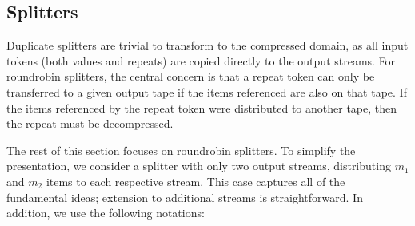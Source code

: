 
\subsection*{Splitters}

Duplicate splitters are trivial to transform to the compressed domain,
as all input tokens (both values and repeats) are copied directly to
the output streams.  For roundrobin splitters, the central concern is
that a repeat token can only be transferred to a given output tape if
the items referenced are also on that tape.  If the items referenced
by the repeat token were distributed to another tape, then the repeat
must be decompressed.

The rest of this section focuses on roundrobin splitters.  To simplify
the presentation, we consider a splitter with only two output streams,
distributing $m_1$ and $m_2$ items to each respective stream.  This
case captures all of the fundamental ideas; extension to additional
streams is straightforward.  In addition, we use the following
notations:

